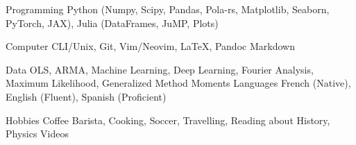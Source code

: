 

\begin{cvskills}

	\cvskill
	{Programming} %
	{Python (Numpy, Scipy, Pandas, Pola-rs, Matplotlib, Seaborn, PyTorch, JAX), Julia (DataFrames, JuMP, Plots)}  %

	\cvskill
	{Computer}
	{CLI/Unix, Git, Vim/Neovim, \LaTeX, Pandoc Markdown}

	\cvskill
	{Data}
	{OLS, ARMA, Machine Learning, Deep Learning, Fourier Analysis, Maximum Likelihood, Generalized Method Moments}
	\cvskill
	{Languages} %
	{French (Native), English (Fluent), Spanish (Proficient)} %

	\cvskill
	{Hobbies}
	{Coffee Barista, Cooking, Soccer, Travelling, Reading about History, Physics Videos}
\end{cvskills}
